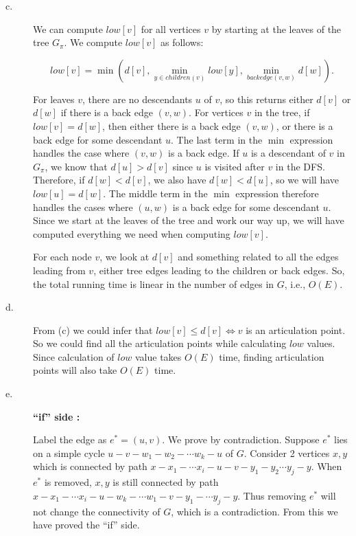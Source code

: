 \begin{description}
\item[c. \hspace{9pt}]
 
We can compute $low[v]$ for all vertices $v$ by starting at the leaves of the tree $G_\pi$. We compute $low[v]$ as follows:

$$low[v] = \min\left(d[v], \min_{y\in children(v)}low[y], \min_{backedge(v, w)}d[w]\right).$$

For leaves $v$, there are no descendants $u$ of $v$, so this returns either $d[v]$ or $d[w]$ if there is a back edge $(v, w)$. For vertices $v$ in the tree, if $low[v] = d[w]$, then either
there is a back edge $(v, w)$, or there is a back edge for some descendant $u$. The last term in the $\min$ expression handles the case where $(v, w)$ is a back edge. If $u$ is a descendant of
$v$ in $G_\pi$, we know that $d[u] > d[v]$ since $u$ is visited after $v$ in the DFS. Therefore, if $d[w] < d[v]$, we also have $d[w]< d[u]$, so we will have $low[u] = d[w]$. The middle term
in the $\min$ expression therefore handles the cases where $(u, w)$ is a back edge for some descendant $u$. Since we start at the leaves of the tree and work our way up, we will have computed
everything we need when computing $low[v]$.

For each node $v$, we look at $d[v]$ and something related to all the edges leading from $v$, either tree edges leading to the children or back edges. So, the total running time is linear in
the number of edges in $G$, i.e., $O(E)$.

\item[d. \hspace{9pt}] From (c) we could infer that $low[v] \leq d[v] \iff v$ is an articulation point. So we could find all the articulation points while calculating $low$ values.
Since calculation of $low$ value takes $O(E)$ time, finding articulation points will also take $O(E)$ time.

\item[e. \hspace{9pt}]

\textbf{``if'' side :}

Label the edge as $e^* = (u, v)$. We prove by contradiction. Suppose $e^*$ lies on a simple cycle $u - v - w_1 - w_2 - \cdots w_k - u$ of $G$. Consider 2 vertices $x, y$ which
is connected by path $x-x_1 -\cdots x_i - u - v - y_1 - y_2 \cdots y_j - y$. When $e^*$ is removed, $x, y$ is still connected by path $x - x_1 - \cdots x_i - u - w_k - \cdots w_1 -v- y_1 -
\cdots y_j -y$. Thus removing $e^*$ will not change the connectivity of $G$, which is a contradiction. From this we have proved  the ``if'' side.


\end{description}
